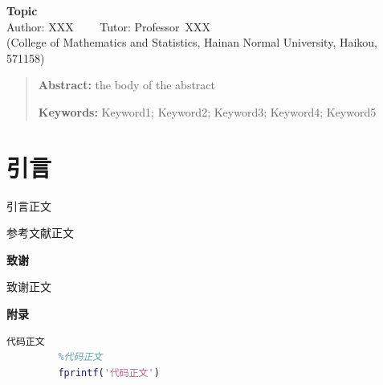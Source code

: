\documentclass[11pt,a4paper]{article}
\begin{document}
\begin{center}
		\Large{\textbf {Topic} }%
		\\
		\large{ Author: XXX ~~~~Tutor: Professor~XXX  %
			\\
			(College of Mathematics and Statistics, Hainan Normal University, Haikou, 571158)}
\end{center}
\renewcommand\baselinestretch{1.4}\selectfont
\begin{quotation} \textbf{Abstract:}
		the body of the abstract
		
	\textbf{Keywords:} Keyword1; Keyword2; Keyword3; Keyword4; Keyword5
\end{quotation}\par

\newpage
{}
\section{引言}

引言正文


\renewcommand\baselinestretch{1.1}\selectfont
\renewcommand\refname{\textbf{参考文献}}
\begin{thebibliography}{99}
	\fangsong
	
	参考文献正文
	
\end{thebibliography}


\renewcommand\baselinestretch{1.4}\selectfont
{}
\begin{flushleft}
	\textbf{致谢}
\end{flushleft}

致谢正文


\begin{flushleft}
	\textbf{附录}
\end{flushleft}

\begin{appendices}
	\begin{lstlisting}[language=matlab]			
         代码正文
         %代码正文
         fprintf('代码正文')
	\end{lstlisting}
\end{appendices}
\end{document}

